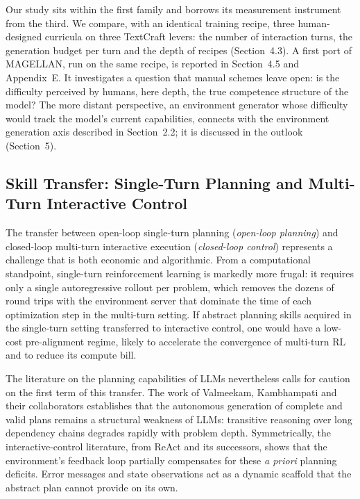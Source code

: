 \documentclass[11pt,a4paper]{article}
\begin{document}
Our study sits within the first family and borrows its measurement instrument from the third. We compare, with an identical training recipe, three human-designed curricula on three TextCraft levers: the number of interaction turns, the generation budget per turn and the depth of recipes (Section~4.3). A first port of MAGELLAN, run on the same recipe, is reported in Section~4.5 and Appendix~E. It investigates a question that manual schemes leave open: is the difficulty perceived by humans, here depth, the true competence structure of the model? The more distant perspective, an environment generator whose difficulty would track the model's current capabilities, connects with the environment generation axis described in Section~2.2; it is discussed in the outlook (Section~5).





\subsection{Skill Transfer: Single-Turn Planning and Multi-Turn Interactive Control}


The transfer between open-loop single-turn planning (\emph{open-loop planning}) and closed-loop multi-turn interactive execution (\emph{closed-loop control}) represents a challenge that is both economic and algorithmic. From a computational standpoint, single-turn reinforcement learning is markedly more frugal: it requires only a single autoregressive rollout per problem, which removes the dozens of round trips with the environment server that dominate the time of each optimization step in the multi-turn setting. If abstract planning skills acquired in the single-turn setting transferred to interactive control, one would have a low-cost pre-alignment regime, likely to accelerate the convergence of multi-turn RL and to reduce its compute bill.

The literature on the planning capabilities of LLMs nevertheless calls for caution on the first term of this transfer. The work of Valmeekam, Kambhampati and their collaborators \cite{valmeekam2023planning, kambhampati2024llmmodulo} establishes that the autonomous generation of complete and valid plans remains a structural weakness of LLMs: transitive reasoning over long dependency chains degrades rapidly with problem depth. Symmetrically, the interactive-control literature, from ReAct \cite{yao2023react} and its successors, shows that the environment's feedback loop partially compensates for these \emph{a priori} planning deficits. Error messages and state observations act as a dynamic scaffold that the abstract plan cannot provide on its own.
\end{document}
